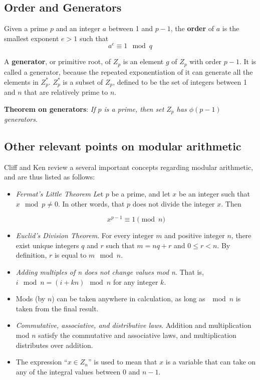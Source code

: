 \subsection{Order and Generators}

Given a prime $p$ and an integer $a$ between 1 and $p-1$, the \textbf{order} of $a$ is the smallest exponent $e > 1 $ such that
\[
  a^{e} \equiv 1 \mod q
\]

A \textbf{generator}, or primitive root, of $Z_{p}$ is an element $g$ of $Z_{p}$ with order $p-1$. It is called a generator, because the repeated exponentiation of it can generate all the elements in $Z_{p}^{*}$. $Z_{p}^{*}$ is a subset of $Z_{p}$, defined to be the set of integers between 1 and $n$ that are relatively prime to $n$. 

\textbf{Theorem on generators}: \textit{If $p$ is a prime, then set $Z_{p}$ has $\phi(p-1)$ generators}. 

\subsection{Other relevant points on modular arithmetic}

Cliff and Ken \cite{cs21math19notes} review a several important concepts regarding modular arithmetic, and are thus listed as follows:

\begin{itemize}
\item \textit{Fermat's Little Theorem}
\textit Let $p$ be a prime, and let $x$ be an integer such that \\ $x \mod p \ne 0$. In other words, that $p$ does not divide the integer $x$. Then

\[
x^{p-1} \equiv 1 \pmod{n}
\]

\item \textit{Euclid's Division Theorem}. For every integer $m$ and positive integer $n$, there exist unique integers $q$ and $r$ such that $m=nq+r$ and $0 \leq r < n$. By definition, $r$ is equal to $m \mod n$.

\item \textit{Adding multiples of n does not change values mod n}. That is, $i \mod n= (i+kn) \mod n$ for any integer $k$.

\item Mods (by $n$) can be taken anywhere in calculation, as long as $\mod n$ is taken from the final result.

\item \textit{Commutative, associative, and distributive laws}. Addition and multiplication mod $n$ satisfy the commutative and associative laws, and multiplication distributes over addition.

\item The expression ``$x \in Z_{n}$'' is used to mean that $x$ is a variable that can take on any of the integral values between 0 and $n-1$.
\end{itemize}

